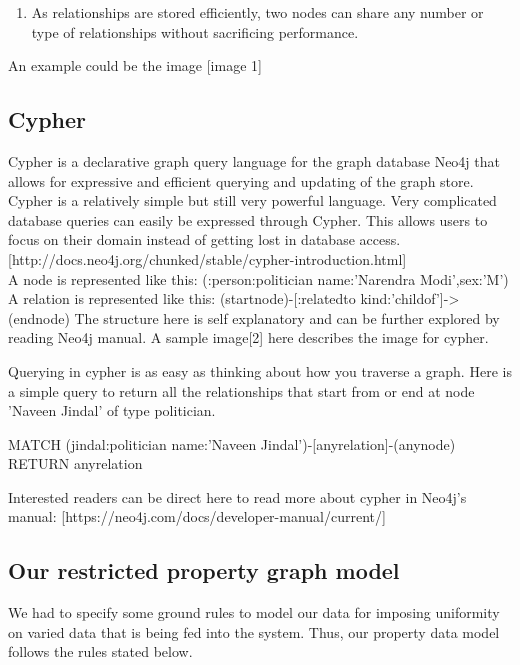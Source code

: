 \begin{enumerate}
\item As relationships are stored efficiently, two nodes can share any number or type of relationships without sacrificing performance.

\end{enumerate}

An example could be the image [image 1]

\subsection{Cypher}

Cypher is a declarative graph query language for the graph database Neo4j that allows for expressive and efficient querying and updating of the graph store. Cypher is a relatively simple but still very powerful language. Very complicated database queries can easily be expressed through Cypher. This allows users to focus on their domain instead of getting lost in database access.[http://docs.neo4j.org/chunked/stable/cypher-introduction.html] \\

A node is represented like this: (:person:politician {name:'Narendra Modi',sex:'M'})
A relation is represented like this: (startnode)-[:relatedto {kind:'childof'}]->(endnode)
The structure here is self explanatory and can be further explored by reading Neo4j manual. A sample image[2] here describes the image for cypher.


Querying in cypher is as easy as thinking about how you traverse a graph. Here is a simple query to return all the relationships that start from or end at node 'Naveen Jindal' of type politician.

MATCH (jindal:politician {name:'Naveen Jindal'})-[anyrelation]-(anynode)
RETURN anyrelation

Interested readers can be direct here to read more about cypher in Neo4j's manual: [https://neo4j.com/docs/developer-manual/current/]

\subsection{Our restricted property graph model}

We had to specify some ground rules to model our data for imposing uniformity on varied data that is being fed into the system. Thus, our property data model follows the rules stated below.


